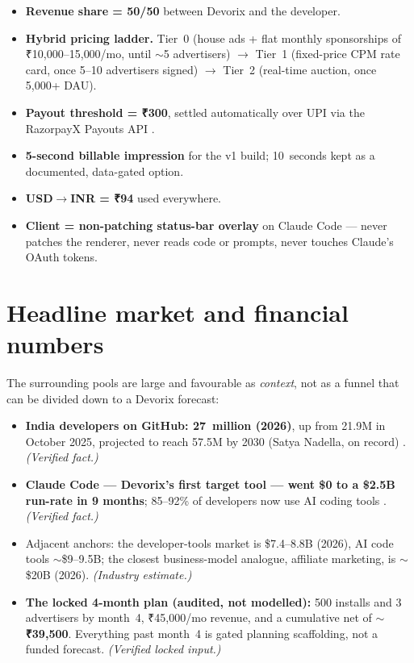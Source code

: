 \begin{itemize}
  \item \textbf{Revenue share = 50/50} between Devorix and the developer.
  \item \textbf{Hybrid pricing ladder.} Tier~0 (house ads + flat monthly
        sponsorships of ₹10{,}000--15{,}000/mo, until $\sim$5
        advertisers) $\rightarrow$ Tier~1 (fixed-price CPM rate card, once
        5--10 advertisers signed) $\rightarrow$ Tier~2 (real-time auction,
        once 5{,}000+ DAU).
  \item \textbf{Payout threshold = ₹300}, settled automatically over UPI
        via the RazorpayX Payouts API \citep{razorpayx_2026}.
  \item \textbf{5-second billable impression} for the v1 build; 10~seconds
        kept as a documented, data-gated option.
  \item \textbf{USD$\rightarrow$INR = ₹94} used everywhere.
  \item \textbf{Client = non-patching status-bar overlay} on Claude Code ---
        never patches the renderer, never reads code or prompts, never touches
        Claude's OAuth tokens.
\end{itemize}

\section{Headline market and financial numbers}

The surrounding pools are large and favourable as \emph{context}, not as a
funnel that can be divided down to a Devorix forecast:

\begin{itemize}
  \item \textbf{India developers on GitHub: 27~million (2026)}, up from 21.9M
        in October 2025, projected to reach 57.5M by 2030 (Satya Nadella, on
        record) \citep{masterplan_2026}. \emph{(Verified fact.)}
  \item \textbf{Claude Code --- Devorix's first target tool --- went \$0 to a
        \$2.5B run-rate in 9 months}; 85--92\% of developers now use AI coding
        tools \citep{masterplan_2026}. \emph{(Verified fact.)}
  \item Adjacent anchors: the developer-tools market is \$7.4--8.8B (2026), AI
        code tools $\sim$\$9--9.5B; the closest business-model analogue,
        affiliate marketing, is $\sim$\$20B (2026). \emph{(Industry
        estimate.)}
  \item \textbf{The locked 4-month plan (audited, not modelled):} 500 installs
        and 3 advertisers by month~4, ₹45{,}000/mo revenue, and a
        cumulative net of $\sim$\textbf{₹39{,}500}. Everything past
        month~4 is gated planning scaffolding, not a funded forecast.
        \emph{(Verified locked input.)}
\end{itemize}

